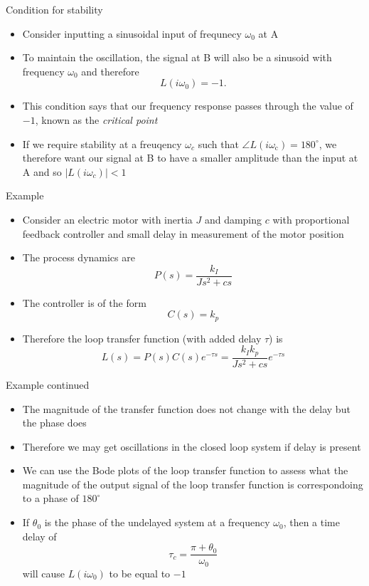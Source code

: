 \documentclass{beamer-control}
\begin{document}
\begin{frame}{Condition for stability}
	
\begin{itemize}
	\item Consider inputting a sinusoidal input of frequnecy $\omega_0$ at A
	\item To maintain the oscillation, the signal at B will also be a sinusoid with frequency $\omega_0$ and therefore
	\[L(i\omega_0)=-1.\]
	\item This condition says that our frequency response passes through the value of $-1$, known as the \textit{critical point}
	\item If we require stability at a freuqency $\omega_c$ such that $\angle L\left(i \omega_{\mathrm{c}}\right)=180^{\circ}$, we therefore want our signal at B to have a smaller amplitude than the input at A and so $|L(i\omega_c)|<1$
\end{itemize}
\end{frame}



\begin{frame}{Example}
\begin{itemize}
\item Consider an electric motor with inertia $J$ and damping $c$ with proportional feedback controller and small delay in measurement of the motor position
\item The process dynamics are 
\[P(s) = \frac{k_I}{Js^2+cs}\]
\item The controller is of the form
\[C(s) = k_p\]
\item Therefore the loop transfer function (with added delay $\tau$) is 
\[L(s) = P(s) C(s) e^{-\tau s} = \frac{k_Ik_p}{Js^2+cs}e^{-\tau s}\]
\end{itemize}
\end{frame}

\begin{frame}{Example continued}
\begin{itemize}
\item The magnitude of the transfer function does not change with the delay but the phase does
\item Therefore we may get oscillations in the closed loop system if delay is present
\item We can use the Bode plots of the loop transfer function to assess what the magnitude of the output signal of the loop transfer function is correspondoing to a phase of $180^\circ$
\item If $\theta_0$ is the phase of the undelayed system at a frequency $\omega_0$, then a time delay of 
\[\tau_c=\frac{\pi+\theta_0}{\omega_0}\]
will cause $L(i\omega_0)$ to be equal to $-1$
\end{itemize}
\end{frame}
\end{document}
